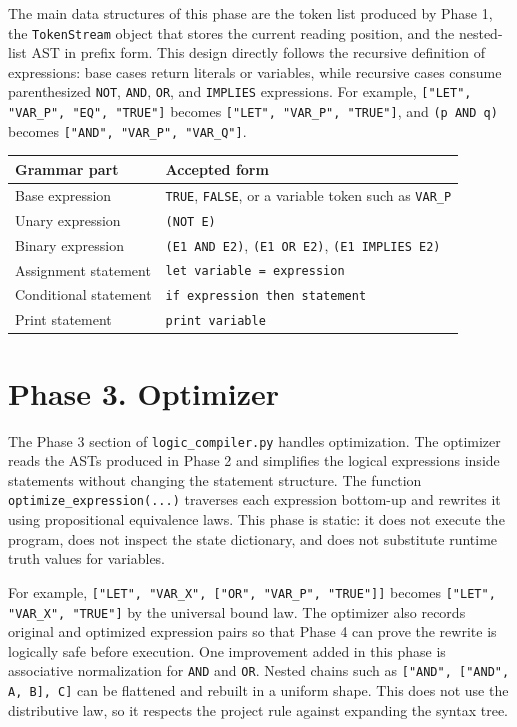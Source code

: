 \documentclass[10pt]{article}
\begin{document}
The main data structures of this phase are the token list produced by Phase 1, the \texttt{TokenStream} object that stores the current reading position, and the nested-list AST in prefix form. This design directly follows the recursive definition of expressions: base cases return literals or variables, while recursive cases consume parenthesized \texttt{NOT}, \texttt{AND}, \texttt{OR}, and \texttt{IMPLIES} expressions. For example, \texttt{["LET", "VAR\_P", "EQ", "TRUE"]} becomes \texttt{["LET", "VAR\_P", "TRUE"]}, and \texttt{(p AND q)} becomes \texttt{["AND", "VAR\_P", "VAR\_Q"]}.

\begin{center}
\begin{tabular}{L{0.30\textwidth} L{0.60\textwidth}}
\toprule
Grammar part & Accepted form \\
\midrule
Base expression & \texttt{TRUE}, \texttt{FALSE}, or a variable token such as \texttt{VAR\_P} \\
Unary expression & \texttt{(NOT E)} \\
Binary expression & \texttt{(E1 AND E2)}, \texttt{(E1 OR E2)}, \texttt{(E1 IMPLIES E2)} \\
Assignment statement & \texttt{let variable = expression} \\
Conditional statement & \texttt{if expression then statement} \\
Print statement & \texttt{print variable} \\
\bottomrule
\end{tabular}
\end{center}

\section{Phase 3. Optimizer}
The Phase 3 section of \texttt{logic\_compiler.py} handles optimization. The optimizer reads the ASTs produced in Phase 2 and simplifies the logical expressions inside statements without changing the statement structure. The function \texttt{optimize\_expression(...)} traverses each expression bottom-up and rewrites it using propositional equivalence laws. This phase is static: it does not execute the program, does not inspect the state dictionary, and does not substitute runtime truth values for variables.

For example, \texttt{["LET", "VAR\_X", ["OR", "VAR\_P", "TRUE"]]} becomes \texttt{["LET", "VAR\_X", "TRUE"]} by the universal bound law. The optimizer also records original and optimized expression pairs so that Phase 4 can prove the rewrite is logically safe before execution. One improvement added in this phase is associative normalization for \texttt{AND} and \texttt{OR}. Nested chains such as \texttt{["AND", ["AND", A, B], C]} can be flattened and rebuilt in a uniform shape. This does not use the distributive law, so it respects the project rule against expanding the syntax tree.
\end{document}
